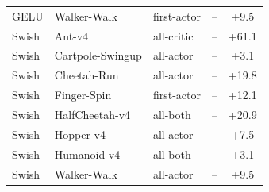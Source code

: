 \begin{table}[t]
\begin{tabular}{lllcc}
GELU & Walker-Walk & first-actor & -- & +9.5 \\
Swish & Ant-v4 & all-critic & -- & +61.1 \\
Swish & Cartpole-Swingup & all-actor & -- & +3.1 \\
Swish & Cheetah-Run & all-actor & -- & +19.8 \\
Swish & Finger-Spin & first-actor & -- & +12.1 \\
Swish & HalfCheetah-v4 & all-both & -- & +20.9 \\
Swish & Hopper-v4 & all-actor & -- & +7.5 \\
Swish & Humanoid-v4 & all-both & -- & +3.1 \\
Swish & Walker-Walk & all-actor & -- & +9.5 \\
\bottomrule
\end{tabular}
\end{table}
